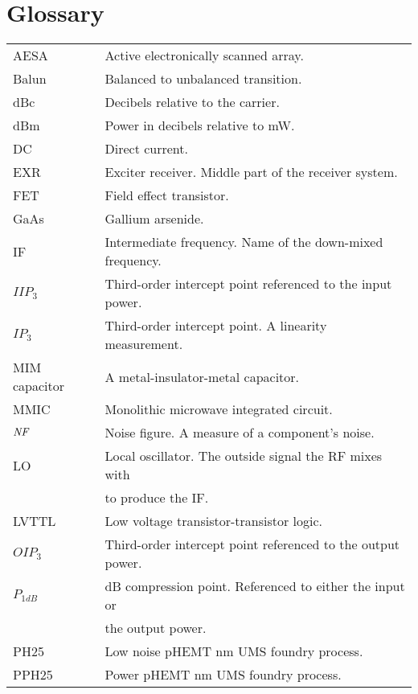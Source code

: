\chapter{Glossary}

	\begin{tabular}{ l l }
		AESA & Active electronically scanned array. \\
		Balun & Balanced to unbalanced transition. \\
		dBc & Decibels relative to the carrier. \\
		dBm & Power in decibels relative to \unit[1]{mW}. \\
		DC & Direct current. \\
		EXR & Exciter receiver. Middle part of the receiver system. \\
		FET & Field effect transistor. \\
		GaAs & Gallium arsenide. \\
		IF & Intermediate frequency. Name of the down-mixed frequency. \\
		$IIP_3$ & Third-order intercept point referenced to the input power. \\
		$IP_3$ & Third-order intercept point. A linearity measurement. \\
		MIM capacitor & A metal-insulator-metal capacitor. \\
		MMIC & Monolithic microwave integrated circuit. \\
		$\emph{NF}$ & Noise figure. A measure of a component's noise. \\
		LO & Local oscillator. The outside signal the RF mixes with \\
		& to produce the IF. \\
		LVTTL & Low voltage transistor-transistor logic. \\
		$OIP_3$ & Third-order intercept point referenced to the output power. \\
		$P_{1dB}$ & \unit[1]{dB} compression point. Referenced to either the input or \\
		& the output power. \\
		PH25 & Low noise pHEMT \unit[250]{nm} UMS foundry process. \\
		PPH25 & Power pHEMT \unit[250]{nm} UMS foundry process. \\

\end{tabular}
